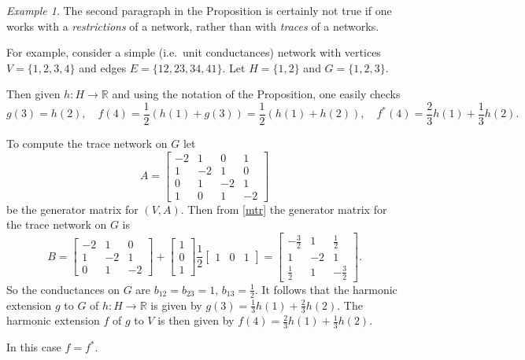 \documentclass[a4paper]{amsart}
\theoremstyle{plain}
\theoremstyle{definition}
\theoremstyle{remark}
\newtheorem{example}[theorem]{Example}
\begin{document}
\begin{example}  The second paragraph in the Proposition is certainly not true if one works with a   \emph{restrictions} of a network, rather than with   \emph{traces} of a networks.   

For example, consider a simple (i.e.\ unit conductances) network with vertices $ V = \{1,2,3,4\} $ and edges $ E=\{12, 23, 34, 41\}$.   Let $ H=\{1,2\} $ and $ G=\{1,2,3\} $.

Then given $ h :H\to \mathbb{R}$ and using the notation of the Proposition, one easily checks
\[
g(3) = h(2), \quad f(4) = \frac{1}{2} (h(1)+g(3)) = \frac{1}{2} (h(1) + h(2)),
\quad f^*(4) = \frac{2}{3} h(1) + \frac{1}{3} h(2).
\]

To compute the trace network on $ G $ let 
\[
A=    \begin{bmatrix} %
      -2 & 1 & 0 & 1 \\
      1 & -2 & 1 & 0 \\
      0 & 1 & -2 & 1 \\
      1 & 0 & 1 & -2  
    \end{bmatrix}
    \]
be the generator matrix for $ (V,A) $.  Then from \eqref{mtr} the generator matrix for the trace network on $ G $ is
\[
B = \begin{bmatrix} %
      -2 & 1 & 0   \\
      1 & -2 & 1   \\
      0 & 1 & -2    
    \end{bmatrix}
+  \begin{bmatrix} 1\\0\\1  \end{bmatrix}  \frac{1}{2}   \begin{bmatrix} 1&0&1  \end{bmatrix} 
 =  \begin{bmatrix} %
      - \frac{3}{2}  & 1 & \frac{1}{2}    \\
      1 & -2 & 1   \\
      \frac{1}{2}  & 1 &   - \frac{3}{2}     
    \end{bmatrix}  .
    \]
So the conductances on $ G $ are $ b_{12}=b_{23}= 1 $, $ b_{13}=\frac{1}{2} $.  It follows that the harmonic extension $ g $ to  $ G $  of $ h:H \to \mathbb{R} $ is given by $ g(3) = \frac{1}{3} h(1) + \frac{2}{3} h(2)$.  The harmonic extension $ f $ of $ g $ to $ V $ is then given by $ f(4) = \frac{2}{3} h(1) + \frac{1}{3} h(2)$.  

In this case $ f = f^* $.
\end{example} 
\end{document}
